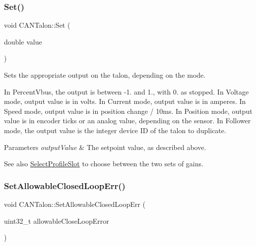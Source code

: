 \subsubsection{\texorpdfstring{Set()}{Set()}}
{\footnotesize\ttfamily void C\+A\+N\+Talon\+::\+Set (\begin{DoxyParamCaption}\item[{double}]{value }\end{DoxyParamCaption})\hspace{0.3cm}{\ttfamily [override]}}

Sets the appropriate output on the talon, depending on the mode.

In Percent\+Vbus, the output is between -\/1. and 1., with 0. as stopped. In Voltage mode, output value is in volts. In Current mode, output value is in amperes. In Speed mode, output value is in position change / 10ms. In Position mode, output value is in encoder ticks or an analog value, depending on the sensor. In Follower mode, the output value is the integer device ID of the talon to duplicate.


\begin{DoxyParams}{Parameters}
{\em output\+Value} & The setpoint value, as described above. \\
\hline
\end{DoxyParams}
\begin{DoxySeeAlso}{See also}
\hyperlink{class_c_a_n_talon_a0f478462884ed5e541179821c44b724f}{Select\+Profile\+Slot} to choose between the two sets of gains. 
\end{DoxySeeAlso}
\mbox{\label{class_c_a_n_talon_ab497835f7003788c3a25b2f8b9e4db55}} 
\subsubsection{\texorpdfstring{Set\+Allowable\+Closed\+Loop\+Err()}{SetAllowableClosedLoopErr()}}
{\footnotesize\ttfamily void C\+A\+N\+Talon\+::\+Set\+Allowable\+Closed\+Loop\+Err (\begin{DoxyParamCaption}\item[{uint32\+\_\+t}]{allowable\+Close\+Loop\+Error }\end{DoxyParamCaption})\hspace{0.3cm}{\ttfamily [virtual]}}

